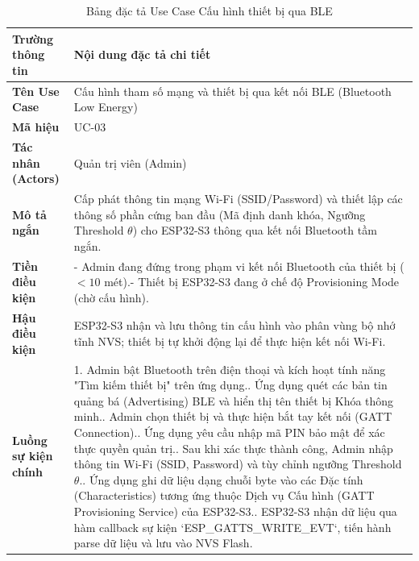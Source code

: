 \begin{table}[htbp]
    \centering
    \caption{Bảng đặc tả Use Case Cấu hình thiết bị qua BLE}
    \label{tab:spec_uc_ble}
    \begin{tabular}{|p{3.5cm}|p{9.5cm}|}
        \hline
        \textbf{Trường thông tin} & \textbf{Nội dung đặc tả chi tiết} \\ \hline
        \textbf{Tên Use Case} & Cấu hình tham số mạng và thiết bị qua kết nối BLE (Bluetooth Low Energy) \\ \hline
        \textbf{Mã hiệu} & UC-03 \\ \hline
        \textbf{Tác nhân (Actors)} & Quản trị viên (Admin) \\ \hline
        \textbf{Mô tả ngắn} & Cấp phát thông tin mạng Wi-Fi (SSID/Password) và thiết lập các thông số phần cứng ban đầu (Mã định danh khóa, Ngưỡng Threshold $\theta$) cho ESP32-S3 thông qua kết nối Bluetooth tầm ngắn. \\ \hline
        \textbf{Tiền điều kiện} & - Admin đang đứng trong phạm vi kết nối Bluetooth của thiết bị ($<10$ mét).\newline - Thiết bị ESP32-S3 đang ở chế độ Provisioning Mode (chờ cấu hình). \\ \hline
        \textbf{Hậu điều kiện} & ESP32-S3 nhận và lưu thông tin cấu hình vào phân vùng bộ nhớ tĩnh NVS; thiết bị tự khởi động lại để thực hiện kết nối Wi-Fi. \\ \hline
        \textbf{Luồng sự kiện chính} &
        1. Admin bật Bluetooth trên điện thoại và kích hoạt tính năng "Tìm kiếm thiết bị" trên ứng dụng.\newline
        2. Ứng dụng quét các bản tin quảng bá (Advertising) BLE và hiển thị tên thiết bị Khóa thông minh.\newline
        3. Admin chọn thiết bị và thực hiện bắt tay kết nối (GATT Connection).\newline
        4. Ứng dụng yêu cầu nhập mã PIN bảo mật để xác thực quyền quản trị.\newline
        5. Sau khi xác thực thành công, Admin nhập thông tin Wi-Fi (SSID, Password) và tùy chỉnh ngưỡng Threshold $\theta$.\newline
        6. Ứng dụng ghi dữ liệu dạng chuỗi byte vào các Đặc tính (Characteristics) tương ứng thuộc Dịch vụ Cấu hình (GATT Provisioning Service) của ESP32-S3.\newline
        7. ESP32-S3 nhận dữ liệu qua hàm callback sự kiện `ESP_GATTS_WRITE_EVT`, tiến hành parse dữ liệu và lưu vào NVS Flash.\newline

\end{tabular}
\end{table}
